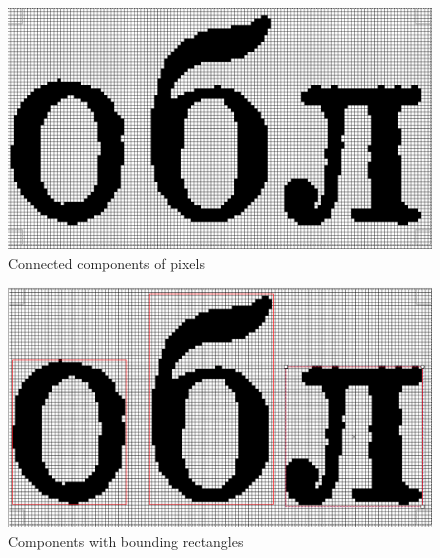\documentclass{article}
\begin{document}
\begin{figure}
	\includegraphics[scale=0.1]{letters.png}
	\caption{Connected components of pixels}
	\label{fig:letters}
\end{figure}
	
\begin{figure}
	\includegraphics[scale=0.13]{rects.png}
	\caption{Components with bounding rectangles}
	\label{fig:rectangles}
\end{figure}
\end{document}
